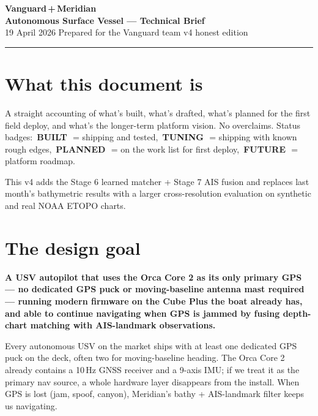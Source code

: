 \documentclass[10pt,a4paper]{article}
\newcommand{\statusbuilt}{{\color{white}\colorbox{mSafe}{\small\bfseries\,BUILT\,}}}
\newcommand{\statusplan}{{\color{white}\colorbox{mWarn}{\small\bfseries\,PLANNED\,}}}
\newcommand{\statusfuture}{{\color{white}\colorbox{mDim}{\small\bfseries\,FUTURE\,}}}
\newcommand{\statustuning}{{\color{white}\colorbox{mWarn}{\small\bfseries\,TUNING\,}}}
\begin{document}
\thispagestyle{empty}

\begin{center}
  {\Huge\bfseries\color{mCyan}Vanguard\,+\,Meridian}\\[3pt]
  {\large\bfseries Autonomous Surface Vessel — Technical Brief}\\[2pt]
  {\color{mDim}\small 19 April 2026 \quad\textbullet\quad Prepared for the Vanguard team \quad\textbullet\quad v4 honest edition}
\end{center}
\vspace{2pt}
\rule{\textwidth}{0.4pt}

\section{What this document is}
A straight accounting of what's built, what's drafted, what's planned for
the first field deploy, and what's the longer-term platform vision. No
overclaims. Status badges: \statusbuilt\ = shipping and tested,
\statustuning\ = shipping with known rough edges, \statusplan\ = on the
work list for first deploy, \statusfuture\ = platform roadmap.

This v4 adds the Stage 6 learned matcher + Stage 7 AIS fusion and
replaces last month's bathymetric results with a larger
cross-resolution evaluation on synthetic and real NOAA ETOPO charts.

\section{The design goal}
\begin{tcolorbox}[colframe=mCyan, colback=white, title=\normalsize The Vanguard claim — once first deploy is proven]
\textbf{A USV autopilot that uses the Orca Core 2 as its only primary GPS
— no dedicated GPS puck or moving-baseline antenna mast required —
running modern firmware on the Cube Plus the boat already has, and
able to continue navigating when GPS is jammed by fusing depth-chart
matching with AIS-landmark observations.}
\end{tcolorbox}

Every autonomous USV on the market ships with at least one dedicated GPS
puck on the deck, often two for moving-baseline heading. The Orca Core 2
already contains a 10\,Hz GNSS receiver and a 9-axis IMU; if we treat it
as the primary nav source, a whole hardware layer disappears from the
install. When GPS is lost (jam, spoof, canyon), Meridian's bathy +
AIS-landmark filter keeps us navigating.
\end{document}
